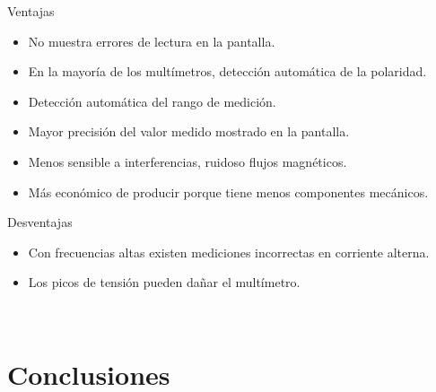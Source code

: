 \documentclass[letterpaper, 12pt]{report}
\begin{document}
\begin{center}
	Ventajas
\end{center}

\begin{itemize}
	\item No muestra errores de lectura en la pantalla.
	\item En la mayoría de los multímetros, detección automática de
	      la polaridad.
	\item Detección automática del rango de medición.
	\item Mayor precisión del valor medido mostrado en la pantalla.
	\item Menos sensible a interferencias, ruidoso flujos magnéticos.
	\item Más económico de producir porque tiene menos componentes mecánicos.
\end{itemize}

\vspace{.5cm}

\begin{center}
	Desventajas
\end{center}

\begin{itemize}
	\item Con frecuencias altas existen mediciones incorrectas en corriente
	      alterna.
	\item Los picos de tensión pueden dañar el multímetro.
\end{itemize}

~\cite{CesarCinjordiz}

\section{Conclusiones}

\newpage

\end{document}
